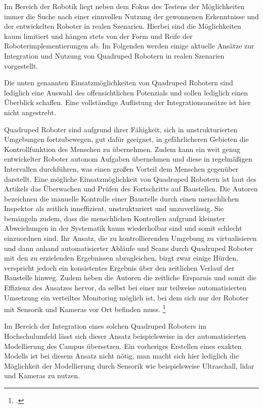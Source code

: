 Im Bereich der Robotik liegt neben dem Fokus des Testens der Möglichkeiten immer die Suche nach einer sinnvollen Nutzung
der gewonnenen Erkenntnisse und der entwickelten Roboter in realen Szenarien.
Hierbei sind die Möglichkeiten kaum limitiert und hängen stets von der Form und Reife der Roboterimplementierungen ab.
Im Folgenden werden einige aktuelle Ansätze zur Integration und Nutzung von Quadruped Robotern in realen Szenarien vorgestellt.

Die unten genannten Einsatzmöglichkeiten von Quadruped Robotern sind lediglich eine Auswahl des offensichtlichen
Potenzials und sollen lediglich einen Überblick schaffen.
Eine vollständige Auflistung der Integrationsansätze ist hier nicht angestrebt.

Quadruped Roboter sind aufgrund ihrer Fähigkeit, sich in unstrukturierten Umgebungen fortzubewegen, gut dafür geeignet,
in gefährlicheren Gebieten die Kontrollfunktion des Menschen zu übernehmen.
Zudem kann ein weit genug entwickelter Roboter autonom Aufgaben übernehmen und diese in regelmäßigen Intervallen durchführen,
was einen großen Vorteil dem Menschen gegenüber darstellt.
Eine mögliche Einsatzmöglichkeit von Quadruped Robotern ist laut des Artikels  das Überwachen und
Prüfen des Fortschritts auf Baustellen.
Die Autoren bezeichnen die manuelle Kontrolle einer Baustelle durch einen menschlichen Inspektor als zeitlich inneffizient,
unstrukturiert und unzuverlässig.
Sie bemängeln zudem, dass die menschlichen Kontrollen aufgrund kleinster Abweichungen in der Systematik kaum wiederholbar sind
und somit schlecht einzuordnen sind.
Ihr Ansatz, die zu kontrollierenden Umgebung zu virtualisieren und dann anhand automatisierter Abläufe und Scans durch
Quadruped Roboter mit den zu erzielenden Ergebnissen abzugleichen, birgt zwar einige Hürden, verspricht jedoch
ein konsistentes Ergebnis über den zeitlichen Verlauf der Baustelle hinweg.
Zudem heben die Autoren die zeitliche Ersparnis und somit die Effizienz des Ansatzes hervor, da selbst bei einer nur teilweise
automatisierten Umsetzung ein verteiltes Monitoring möglich ist, bei dem sich nur der Roboter mit Sensorik und Kameras vor Ort befinden muss.
\footcite{construction_quadruped}

Im Bereich der Integration eines solchen Quadruped Roboters im Hochschulumfeld lässt sich dieser Ansatz beispielsweise
in der automatisierten Modellierung des Campus übersetzen.
Ein vorheriges Erstellen eines exakten Modells ist bei diesem Ansatz nicht nötig, man macht sich hier lediglich die
Möglichkeit der Modellierung durch Sensorik wie beispielsweise Ultraschall, \gls{lidar} und Kameras zu nutzen.


